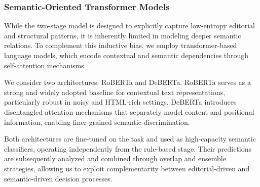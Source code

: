 

\subsubsection{Semantic-Oriented Transformer Models}

While the two-stage model is designed to explicitly capture low-entropy
editorial and structural patterns, it is inherently limited in modeling
deeper semantic relations.
To complement this inductive bias, we employ transformer-based language
models, which encode contextual and semantic dependencies through
self-attention mechanisms.

We consider two architectures: RoBERTa and DeBERTa.
RoBERTa serves as a strong and widely adopted baseline for contextual text
representations, particularly robust in noisy and HTML-rich settings.
DeBERTa introduces disentangled attention mechanisms that separately model
content and positional information, enabling finer-grained semantic
discrimination.

Both architectures are fine-tuned on the task and used as high-capacity
semantic classifiers, operating independently from the rule-based stage.
Their predictions are subsequently analyzed and combined through overlap
and ensemble strategies, allowing us to exploit complementarity between
editorial-driven and semantic-driven decision processes.

